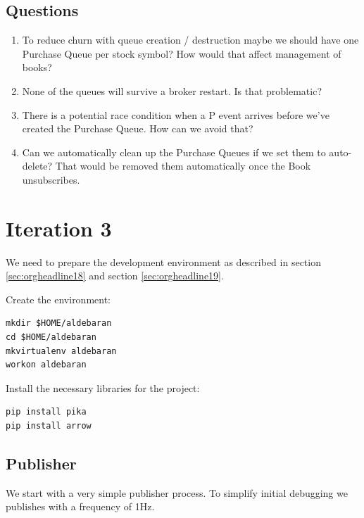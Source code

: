 \documentclass[captions=tableheading]{scrreprt}
\begin{document}
\subsection{Questions}
\label{sec:orgheadline16}
\begin{enumerate}
\item To reduce churn with queue creation / destruction maybe we should
have one Purchase Queue per stock symbol? How would that affect
management of books?
\item None of the queues will survive a broker restart. Is that problematic?
\item There is a potential race condition when a P event arrives before
we've created the Purchase Queue. How can we avoid that?
\item Can we automatically clean up the Purchase Queues if we set them to
auto-delete? That would be removed them automatically once the Book
unsubscribes.
\end{enumerate}


\section{Iteration 3}
\label{sec:orgheadline21}
We need to prepare the development environment as described in section
\ref{sec:orgheadline18} and section \ref{sec:orgheadline19}.

Create the environment:

\begin{verbatim}
mkdir $HOME/aldebaran
cd $HOME/aldebaran
mkvirtualenv aldebaran
workon aldebaran
\end{verbatim}

Install the necessary libraries for the project:
\begin{verbatim}
pip install pika
pip install arrow
\end{verbatim}

\subsection{Publisher}
\label{sec:orgheadline20}
We start with a very simple publisher process. To simplify initial
debugging we publishes with a frequency of 1Hz.
\end{document}
